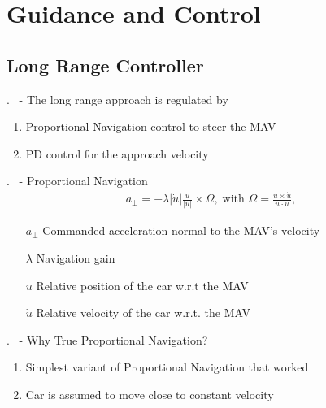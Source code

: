\section{Guidance and Control}

\subsection{Long Range Controller}


\begin{frame}{\thesection. \insertsection \ - \insertsubsection}
	The long range approach is regulated by
	\begin{enumerate}
		\item Proportional Navigation control to steer the MAV
		\item PD control for the approach velocity
	\end{enumerate}
\end{frame}


\begin{frame}{\thesection. \insertsection \ - \insertsubsection}
	Proportional Navigation 
	\begin{align}
		a_{\perp} = - \lambda |\dot{u}| \frac{u}{|u|} \times \Omega,
\; \text{with } \Omega = \frac{u \times \dot{u}}{u \cdot u},
	\end{align}
	\begin{enumerate}
	\item[$a_{\perp}$] Commanded acceleration normal to the MAV's velocity
	\item[$\lambda$] Navigation gain
	\item[$u$] Relative position of the car w.r.t the MAV
	\item[$\dot{u}$] Relative velocity of the car w.r.t. the MAV
	\end{enumerate}
\end{frame}


\begin{frame}{\thesection. \insertsection \ - \insertsubsection}
	Why True Proportional Navigation?
	\begin{enumerate}
		\item Simplest variant of Proportional Navigation that worked
		\item Car is assumed to move close to constant velocity
	\end{enumerate}
\end{frame}

